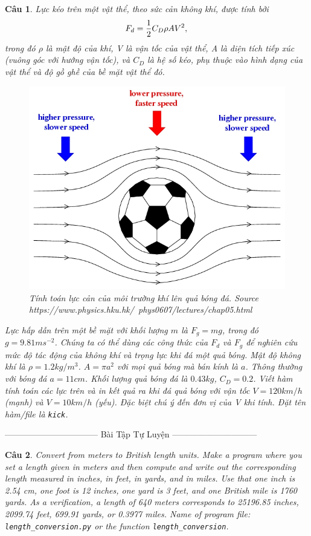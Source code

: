 \documentclass[answers]{exam}
\newtheorem{bt}{Câu}
\begin{document}
\begin{bt} Lực kéo trên một vật thể, theo sức cản không khí, được tính bởi  
%
\[
F_d = \dfrac{1}{2} C_D \rho A V^2, \\
\]
%
trong đó $\rho$ là mật độ của khí, V là vận tốc của vật thể, A là diện tích tiếp xúc 
(vuông góc với hướng vận tốc), và $C_D$ là hệ số kéo, phụ thuộc vào hình dạng của vật thể và độ gồ ghề của bề mặt vật thể đó. 
%
\begin{figure}[!h]
	\centering
	\includegraphics[width=0.7\linewidth]{Figures/forces_on_football}
	\caption{Tính toán lực cản của môi trường khí lên quả bóng đá. Source https://www.physics.hku.hk/~phys0607/lectures/chap05.html}
	\label{fig:forcesonfootball}
\end{figure}
%
Lực hấp dẫn trên một bề mặt với khối lượng $m$ là $F_g = mg$, trong đó $g = 9.81m s^{-2}$.
Chúng ta có thể dùng các công thức của $F_d$ và $F_g$ để nghiên cứu mức độ tác động của không khí và trọng lực khi đá một quả bóng. 
Mật độ không khí là $\rho = 1.2 kg/m^3$. 
$A = \pi a^2$ với mọi quả bóng mà bán kính là $a$. Thông thường với bóng đá $a = 11 cm$. 
Khối lượng quả bóng đá là $0.43 kg$, $C_D= 0.2$. 
Viết hàm tính toán các lực trên và in kết quả ra khi đá quả bóng với vận tốc $V = 120 km/h$ (mạnh) và $V = 10 km/h$ (yếu).
Đặc biệt chú ý đến đơn vị của V khi tính. Đặt tên hàm/file là \verb|kick|.
\end{bt}

\centerline{——————————— Bài Tập Tự Luyện  ——————————}

\begin{bt}
	Convert from meters to British length units. Make a program where you set a length given in meters and then
	compute and write out the corresponding length measured in inches, in feet, in yards, and in miles. Use that one inch is 2.54 cm, one foot is
	12 inches, one yard is 3 feet, and one British mile is 1760 yards. As a verification, a length of 640 meters corresponds to 25196.85 inches,
	2099.74 feet, 699.91 yards, or 0.3977 miles. Name of program file: \verb|length_conversion.py| or the function \verb|length_conversion|. 
\end{bt}
\end{document}
